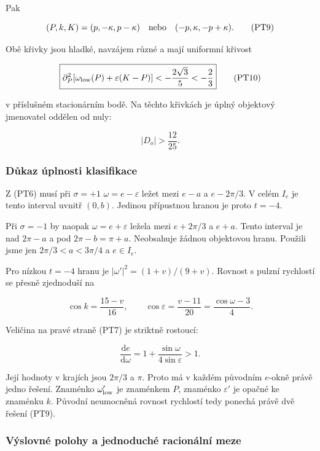 \documentclass[11pt,a4paper]{article}
\theoremstyle{remark}\newtheorem{remark}[theorem]{Poznámka}
\numberwithin{equation}{section}
\begin{document}
Pak

\[
(P,k,K)=(p,-\kappa,p-\kappa)
\quad\hbox{nebo}\quad
(-p,\kappa,-p+\kappa).
\tag{PT9}
\]

Obě křivky jsou hladké, navzájem různé a mají uniformní křivost

\[
\boxed{
\partial_P^2[
\omega_{\rm low}(P)+\varepsilon(K-P)]
<-\frac{2\sqrt3}{5}<-\frac23
}
\tag{PT10}
\]

v příslušném stacionárním bodě. Na těchto křivkách je úplný
objektový jmenovatel oddělen od nuly:

\[
\boxed{|D_o|>\frac{12}{25}.}
\tag{PT11}
\]

\subsubsection{Důkaz úplnosti klasifikace}\label{dux16fkaz-uxfaplnosti-klasifikace}

Z (PT6) musí při \(\sigma=+1\)
\(\omega=e-\varepsilon\) ležet mezi
\(e-a\) a \(e-2\pi/3\). V celém \(I_e\) je tento interval
uvnitř \((0,b)\). Jedinou přípustnou hranou je proto \(t=-4\).

Při \(\sigma=-1\) by naopak
\(\omega=e+\varepsilon\) ležela mezi \(e+2\pi/3\) a \(e+a\).
Tento interval je nad \(2\pi-a\) a pod \(2\pi-b=\pi+a\).
Neobsahuje žádnou objektovou hranu. Použili jsme jen
\(2\pi/3<a<3\pi/4\) a \(e\in I_e\).

Pro nízkou \(t=-4\) hranu je
\(|\omega'|^2=(1+v)/(9+v)\). Rovnost s pulzní rychlostí se
přesně zjednoduší na

\[
\cos k=\frac{15-v}{16},\qquad
\cos\varepsilon=\frac{v-11}{20}
=\frac{\cos\omega-3}{4}.
\tag{PT12}
\]

Veličina na pravé straně (PT7) je striktně rostoucí:

\[
\frac{\mathrm de}{\mathrm d\omega}
=1+\frac{\sin\omega}{4\sin\varepsilon}>1.
\tag{PT13}
\]

Její hodnoty v krajích jsou \(2\pi/3\) a \(\pi\).
Proto má v každém původním \(e\)-okně právě jedno řešení.
Znaménko \(\omega_{\rm low}'\) je znaménkem \(P\),
znaménko \(\varepsilon'\) je opačné ke znaménku \(k\).
Původní neumocněná rovnost rychlostí tedy ponechá právě dvě řešení (PT9).

\subsubsection{Výslovné polohy a jednoduché racionální meze}\label{vuxfdslovnuxe9-polohy-a-jednoduchuxe9-racionuxe1lnuxed-meze}
\end{document}
